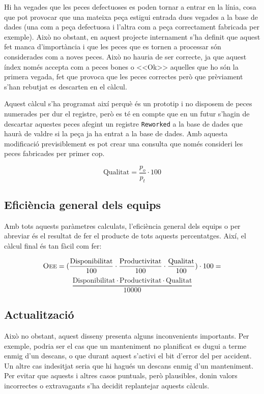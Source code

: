 \documentclass{tfgitic}[2022/06/30]
\begin{document}
Hi ha vegades que les peces defectuoses es poden tornar a entrar en la línia, cosa que pot provocar que una mateixa peça estigui entrada dues vegades a la base de dades (una com a peça defectuosa i l'altra com a peça correctament fabricada per exemple). Això no obstant, en aquest projecte internament s'ha definit que aquest fet manca d'importància i que les peces que es tornen a processar són considerades com a noves peces. Això no hauria de ser correcte, ja que aquest índex només accepta com a peces bones o <<Ok>> aquelles que ho són la primera vegada, fet que provoca que les peces correctes però que prèviament s'han rebutjat es descarten en el càlcul.

Aquest càlcul s'ha programat així perquè és un prototip i no disposem de peces numerades per dur el registre, però es té en compte que en un futur s'hagin de descartar aquestes peces afegint un registre \texttt{Reworked} a la base de dades que haurà de valdre  si la peça ja ha entrat a la base de dades. Amb aquesta modificació previsiblement es pot crear una consulta que només consideri les peces fabricades per primer cop.

\[\textrm{Qualitat} = \frac{p_{o}}{p_{t}} \cdot 100\]

\subsection{Eficiència general dels equips}
\label{section:oeeCalc}
Amb tots aquests paràmetres calculats, l'eficiència general dels equips o  per abreviar és el resultat de fer el producte de tots aquests percentatges. Així, el càlcul final és tan fàcil com fer:

\[\textrm{\textsc{Oee}} = (\frac{\textrm{Disponibilitat}}{100} \cdot \frac{\textrm{Productivitat}}{100} \cdot \frac{\textrm{Qualitat}}{100}) \cdot 100 =\]
\[\frac{\textrm{Disponibilitat} \cdot \textrm{Productivitat} \cdot \textrm{Qualitat}}{10000}\]

\subsection{Actualització}
Això no obstant, aquest disseny presenta alguns inconvenients importants. Per exemple, podria ser el cas que un manteniment no planificat es dugui a terme enmig d'un descans, o que durant aquest s'activi el bit d'error del  per accident. Un altre cas indesitjat seria que hi hagués un descans enmig d'un manteniment. Per evitar que aquests i altres casos puntuals, però plausibles, donin valors incorrectes o extravagants s'ha decidit replantejar aquests càlculs.
\end{document}
